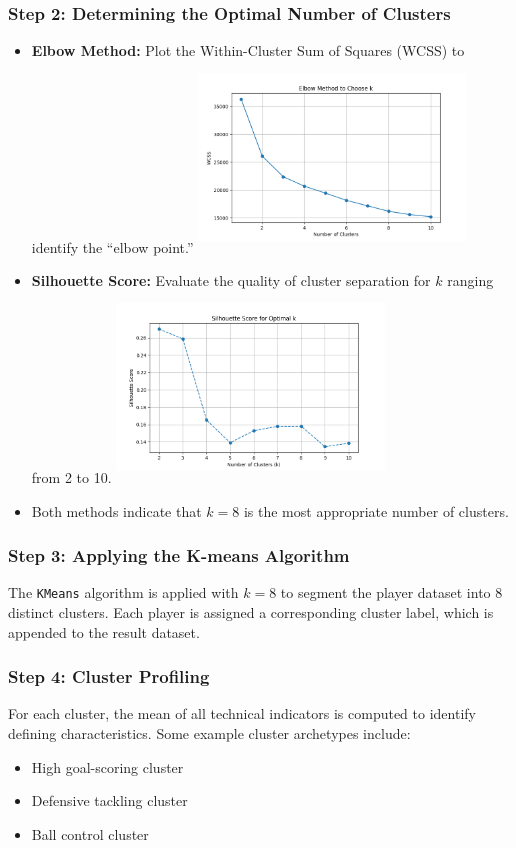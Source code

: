 \documentclass[12pt,a4paper]{article}
\begin{document}
\subsubsection{Step 2: Determining the Optimal Number of Clusters}
\begin{itemize}
    \item \textbf{Elbow Method:} Plot the Within-Cluster Sum of Squares (WCSS) to identify the “elbow point.”
    \includegraphics[width=2.8in,height=2in]{ProblemIII-elbow.png}
    \item \textbf{Silhouette Score:} Evaluate the quality of cluster separation for $k$ ranging from 2 to 10.
     \includegraphics[width=2.8in,height=2in]{ProblemIII-Silhouette.png}
    \item Both methods indicate that $k = 8$ is the most appropriate number of clusters.
\end{itemize}

\subsubsection{Step 3: Applying the K-means Algorithm}
The \texttt{KMeans} algorithm is applied with $k = 8$ to segment the player dataset into 8 distinct clusters. Each player is assigned a corresponding cluster label, which is appended to the result dataset.

\subsubsection{Step 4: Cluster Profiling}
For each cluster, the mean of all technical indicators is computed to identify defining characteristics. Some example cluster archetypes include:
\begin{itemize}
    \item High goal-scoring cluster
    \item Defensive tackling cluster
    \item Ball control cluster
\end{itemize}
\end{document}
